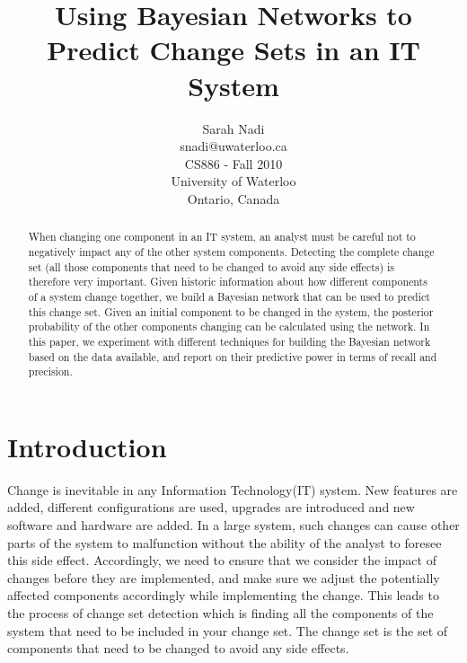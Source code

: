 \documentclass[10pt,twocolumn,letterpaper]{article}
\begin{document}
 
\title{Using Bayesian Networks to Predict Change Sets in an IT System}

\author{Sarah Nadi\\snadi@uwaterloo.ca\\CS886 - Fall 2010\\University of Waterloo\\ Ontario, Canada}        
\thispagestyle{empty}
\maketitle


\begin{abstract} 
When changing one component in an IT system, an analyst must be careful not to negatively impact any of the other system components. Detecting the complete
change set (all those components that need to be changed to avoid any side effects) is therefore very important. Given historic information about how different
components of a system change together, we build a Bayesian network that can be used to predict this change set. Given an initial component to be changed in
the system, the posterior probability of the other components changing can be calculated using the network. In this paper, we experiment with different
techniques for building the Bayesian network based on the data available, and report on their predictive power in terms of recall and precision.
\end{abstract} 



\section{Introduction}
\label{intro}

Change is inevitable in any Information Technology(IT) system. New features are added, different configurations are used, upgrades are introduced and new
software and hardware are added. In a large system, such changes can cause other parts of the system to malfunction without the ability of the analyst to
foresee this side effect. Accordingly, we need to ensure that we consider the impact of changes before they are implemented, and make sure we adjust the
potentially affected components accordingly while implementing the change. This leads to the process of change set detection which is finding all the
components of the system that need to be included in your change set. The change set is the set of components that need to be changed to avoid any side
effects. 
\end{document}
